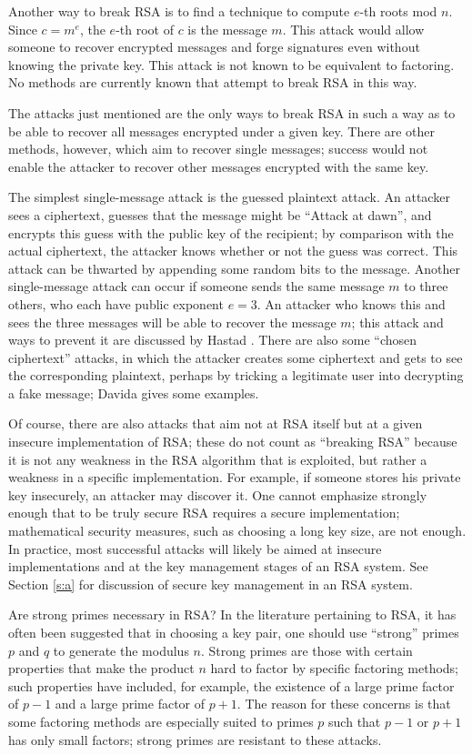 Another way to break RSA is to find a technique to compute $e$-th roots mod 
$n$. Since $c = m^e$, the $e$-th root of $c$ is the message $m$. This attack 
would allow someone to recover encrypted messages and forge signatures even
without knowing the private key. This attack is not known to be equivalent to 
factoring. No methods are currently known that attempt to break RSA in this 
way. 

The attacks just mentioned are the only ways to break RSA in such a 
way as to be able to recover all messages encrypted under a given key. 
There are other methods, however, which aim to recover single messages;
success would not enable the attacker to recover other messages 
encrypted with the same key. 

The simplest single-message attack is the guessed plaintext attack. An 
attacker sees a ciphertext, guesses that the message might be ``Attack at 
dawn'', and encrypts this guess with the public key of the recipient; by 
comparison with the actual ciphertext, the attacker knows whether or not 
the guess was correct. This attack can be thwarted by appending some random 
bits to the message. Another single-message attack can occur if someone 
sends the same message $m$ to three others, who each have public exponent 
$e=3$. An attacker who knows this and sees the three messages will be able 
to recover the message $m$; this attack and ways to prevent it are discussed 
by Hastad \cite{hastad}. There are also some ``chosen ciphertext'' attacks, in 
which the attacker creates some ciphertext and gets to see the corresponding 
plaintext, perhaps by tricking a legitimate user into decrypting a fake 
message; Davida \cite{davida} gives some examples.

Of course, there are also attacks that aim not at RSA itself but at
a given insecure implementation of RSA; these do not count as ``breaking
RSA'' because it is not any weakness in the RSA algorithm that is exploited,
but rather a weakness in a specific implementation. For example, if someone 
stores his private key insecurely, an attacker may discover it. One cannot 
emphasize strongly enough that to be truly secure RSA requires a secure 
implementation; mathematical security measures, such as choosing a long key 
size, are not enough. In practice, most successful attacks will likely be 
aimed at insecure implementations and at the key management stages of an RSA 
system. See Section \ref{s:a} for discussion of secure key management in an 
RSA system.

{Are strong primes necessary in RSA?}
In the literature pertaining to RSA, it has often been suggested that in 
choosing a key pair, one should use ``strong'' primes $p$ and $q$ to
generate the modulus $n$. Strong primes are those with certain properties 
that make the product $n$ hard to factor by specific factoring methods; 
such properties have included, for example, the existence of a large 
prime factor of $p-1$ and a large prime factor of $p+1$. The reason for 
these concerns is that some factoring methods are especially suited to 
primes $p$ such that $p-1$ or $p+1$ has only small factors; strong primes
are resistant to these attacks. 

